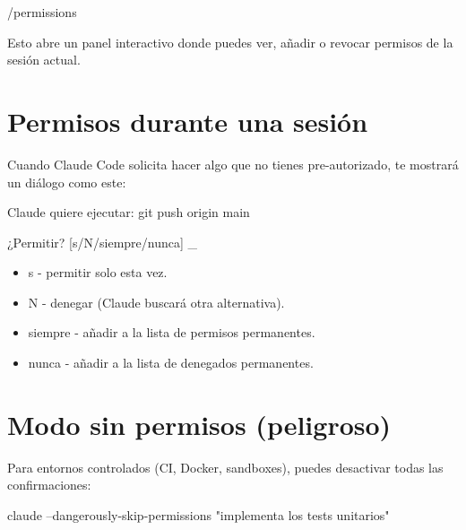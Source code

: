 \documentclass[11pt,a4paper]{book}
\begin{document}
\begin{codebox}
/permissions
\end{codebox}
Esto abre un panel interactivo donde puedes ver, añadir o revocar permisos de la sesión actual.

\section{Permisos durante una sesión}
Cuando Claude Code solicita hacer algo que no tienes pre-autorizado, te mostrará un diálogo como este:

\begin{codebox}
Claude quiere ejecutar:
  git push origin main

¿Permitir? [s/N/siempre/nunca] _
\end{codebox}
\begin{itemize}\item s - permitir solo esta vez.\end{itemize}
\begin{itemize}\item N - denegar (Claude buscará otra alternativa).\end{itemize}
\begin{itemize}\item siempre - añadir a la lista de permisos permanentes.\end{itemize}
\begin{itemize}\item nunca - añadir a la lista de denegados permanentes.\end{itemize}
\section{Modo sin permisos (peligroso)}
Para entornos controlados (CI, Docker, sandboxes), puedes desactivar todas las confirmaciones:

\begin{codebox}
claude --dangerously-skip-permissions "implementa los tests unitarios"
\end{codebox}
\end{document}
